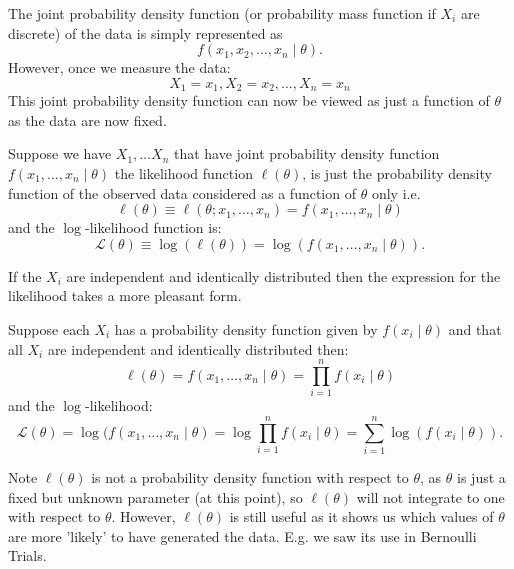 \documentclass[10pt, a4paper]{article}
\begin{document}
The joint probability density function
(or probability mass function if $X_i$ are discrete)
of the data is simply represented as
\[
f(x_1, x_2, \dotsc, x_n\mid\theta).
\]
However,
once we measure the data:
\[
X_1 = x_1, X_2 = x_2, \dotsc, X_n = x_n
\]
This joint probability density function can now be viewed as just a function of $\theta$ as the data are now fixed.

\begin{definition}
    Suppose we have $X_1, \dotsc X_n$ that have joint probability density function $f(x_1, \dotsc, x_n\mid \theta)$ the likelihood function $\ell(\theta)$,
    is just the probability density function of the observed data considered as a function of $\theta$ only i.e.
    \[
    \ell(\theta) \equiv \ell(\theta; x_1, \dotsc, x_n) = f(x_1, \dotsc, x_n\mid \theta)
    \]
    and the $\log$-likelihood function is:
    \[
    \mathcal{L}(\theta) \equiv \log(\ell(\theta)) = \log(f(x_1, \dotsc, x_n\mid \theta)).
    \]
\end{definition}

\begin{definition}
    If the $X_i$ are independent and identically distributed then the expression for the likelihood takes a more pleasant form.

    Suppose each $X_i$ has a probability density function given by $f(x_i\mid\theta)$ and that all $X_i$ are independent and identically distributed then:
    \[
    \ell(\theta) = f(x_1, \dotsc, x_n\mid\theta) = \prod_{i = 1}^{n}f(x_i\mid\theta)
    \]
    and the $\log$-likelihood:
    \[
    \mathcal{L}(\theta) = \log(f(x_1, \dotsc, x_n\mid\theta) = \log{\prod_{i = 1}^{n}f(x_i\mid\theta)} = \sum_{i = 1}^{n}\log(f(x_i\mid\theta)).
    \]
\end{definition}

Note $\ell(\theta)$ is not a probability density function with respect to $\theta$,
as $\theta$ is just a fixed but unknown parameter
(at this point),
so $\ell(\theta)$ will not integrate to one with respect to $\theta$.
However,
$\ell(\theta)$ is still useful as it shows us which values of $\theta$ are more 'likely' to have generated the data.
E.g.
we saw its use in Bernoulli Trials.
\end{document}
